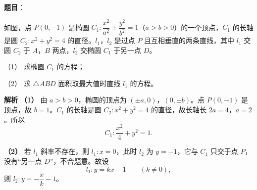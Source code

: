 \begin{answer}

\textbf{题目}：

如图，点 $P(0,-1)$ 是椭圆 $C_1:\dfrac{x^2}{a^2}+\dfrac{y^2}{b^2}=1$（$a>b>0$）的一个顶点，$C_1$ 的长轴是圆 $C_2:x^2+y^2=4$ 的直径。$l_1$，$l_2$ 是过点 $P$ 且互相垂直的两条直线，其中 $l_1$ 交圆 $C_2$ 于 $A$，$B$ 两点，$l_2$ 交椭圆 $C_1$ 于另一点 $D$。

（1） 求椭圆 $C_1$ 的方程；

（2） 求 $\triangle ABD$ 面积取最大值时直线 $l_1$ 的方程。
\nopagebreak[4]
\begin{center}\end{center}
\nopagebreak[4]
\textbf{解析}
\textbf{（1）} 由 $a>b>0$，椭圆的顶点为 $(\pm a,0)$，$(0,\pm b)$。点 $P(0,-1)$ 是顶点，故 $b=1$。$C_1$ 的长轴是圆 $C_2:x^2+y^2=4$ 的直径，故长轴长 $2a=4$，$a=2$。所以
\nopagebreak[4]
\[C_1:\frac{x^2}4+y^2=1.\]

\textbf{（2）} 若 $l_1$ 斜率不存在，则 $l_1:x=0$，此时 $l_2$ 为 $y=-1$，它与 $C_1$ 只交于点 $P$，没有“另一点 $D$”，不合题意。故设
\nopagebreak[4]
\[l_1:y=kx-1\qquad(k\neq0),\]
则 $l_2:y=-\dfrac xk-1$。


\end{answer}
